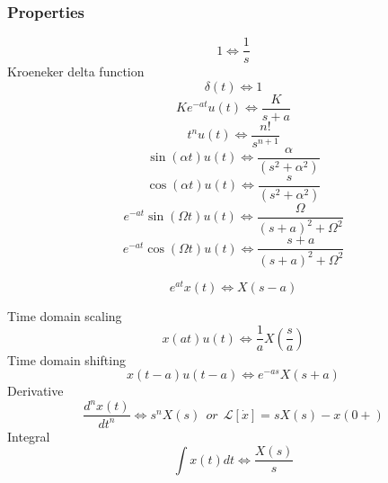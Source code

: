 \documentclass{article}
\begin{document}
		\subsubsection{Properties}
			\begin{equation}
				1 \Leftrightarrow \frac{1}{{s}}
			\end{equation}
			Kroeneker delta function
			\begin{equation}
				\delta (t) \Leftrightarrow 1
			\end{equation}
			\begin{equation}
				Ke^{ - at} u(t) \Leftrightarrow \frac{K}{{s + a}}			
			\end{equation}
			\begin{equation}
				t^n u(t) \Leftrightarrow \frac{{n!}}{{s^{n + 1} }}
			\end{equation}
			\begin{equation}
				\sin (\alpha t)u(t) \Leftrightarrow \frac{\alpha }{{(s^2 + \alpha ^2 )}}
			\end{equation}
			\begin{equation}
				\cos (\alpha t)u(t) \Leftrightarrow \frac{s}{{(s^2 + \alpha ^2 )}}
			\end{equation}
			\begin{equation}
			e^{ - at} \sin (\Omega t)u(t) \Leftrightarrow \frac{\Omega }{{(s + a)^2 + \Omega ^2 }}
			\end{equation}
			\begin{equation}
				e^{ - at} \cos (\Omega t)u(t) \Leftrightarrow \frac{{s + a}}{{(s + a)^2 + \Omega ^2 }}
			\end{equation}

			\begin{equation}
				e^{at} x(t) \Leftrightarrow X(s-a)
			\end{equation}			
			
			Time domain scaling
			\begin{equation}
				x(at)u(t) \Leftrightarrow \frac{1}{a}X\left( {\frac{s}{a}} \right)
			\end{equation}
			Time domain shifting 
			\begin{equation}
				x(t - a)u(t - a) \Leftrightarrow e^{ - as} X(s + a)
			\end{equation}
			Derivative
			\begin{equation}
				\frac{{d^n x(t)}}{{dt^n }} \Leftrightarrow s^n X(s) \ \ or \ \ \mathcal{L}[\dot{x}] = sX(s)-x(0+)
			\end{equation}
			Integral			
			\begin{equation}
				\int{x(t)dt} \Leftrightarrow \frac{X(s)}{s}
			\end{equation}			
			
\end{document}
